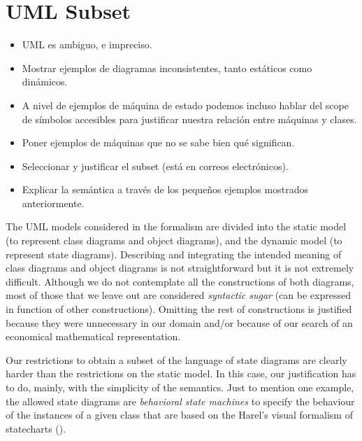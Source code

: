 \section{UML Subset}
\label{sec:umlsubset}

\begin{itemize}
\item UML es ambiguo, e impreciso.
\item Mostrar ejemplos de diagramas inconsistentes, tanto estáticos
  como dinámicos.
\item A nivel de ejemplos de máquina de estado podemos incluso hablar
  del scope de símbolos accesibles para justificar nuestra relación
  entre máquinas y clases.
\item Poner ejemplos de máquinas que no se sabe bien qué significan.
\item Seleccionar y justificar el subset (está en correos electrónicos).
\item Explicar la semántica a través de los pequeños ejemplos
  mostrados anteriormente.
\end{itemize}

The UML models considered in the formalism are divided into the static
model (to represent class diagrams and object diagrams), and the
dynamic model (to represent state diagrams). Describing and
integrating the intended meaning of class diagrams and object diagrams
is not straightforward but it is not extremely difficult. Although we
do not contemplate all the constructions of both diagrams, most of
those that we leave out are considered \emph{syntactic sugar} (can be
expressed in function of other constructions). Omitting the rest of
constructions is justified because they were unnecessary in our domain
and/or because of our search of an economical mathematical
representation.

Our restrictions to obtain a subset of the language of state diagrams
are clearly harder than the restrictions on the static model. In this
case, our justification has to do, mainly, with the simplicity of the
semantics. Just to mention one example, the allowed state diagrams are
\emph{behavioral state machines} to specify the behaviour of the
instances of a given class that are based on the Harel's visual
formalism of statecharts (\cite{harel}).


